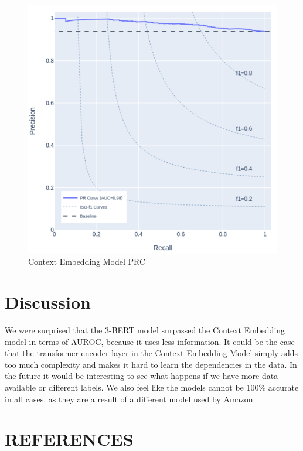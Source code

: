 \documentclass[utf8x]{ctexart}
\begin{document}
\begin{figure}[htb]
  \centering
  \includegraphics[width=\linewidth]{./cemprc.png}
  \caption{Context Embedding Model PRC}
  \label{fig:cemprc}
\end{figure}


\section{Discussion}

We were surprised that the 3-BERT model surpassed the Context Embedding model in terms of AUROC, because it uses less information. It could be the case that the transformer encoder layer in the Context Embedding Model simply adds too much complexity and makes it hard to learn the dependencies in the data. In the future it would be interesting to see what happens if we have more data available or different labels. We also feel like the models cannot be 100\% accurate in all cases, as they are a result of a different model used by Amazon.

\vfill\pagebreak

\section{REFERENCES}
\label{sec:refs}

% 
% 
\end{document}
